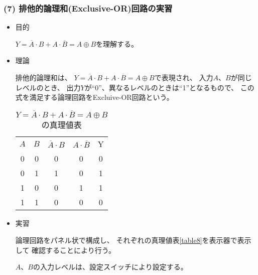 \documentclass[12pt]{jarticle}
\begin{document}
\subsubsection*{(7) 排他的論理和(Exclusive-OR)回路の実習}
\begin{itemize}
    \item 目的

          $Y = \overline{A} \cdot B + A \cdot \overline{B} = A \oplus B$を理解する。

    \item 理論

          排他的論理和は、
          $Y = \overline{A} \cdot B + A \cdot \overline{B} = A \oplus B$で表現され、
          入力$A$、$B$が同じレベルのとき、
          出力$Y$が``0''、異なるレベルのときは``1''となるもので、
          この式を満足する論理回路をExcluive-OR回路という。

          \begin{table}[h]
              \caption{$Y = \overline{A} \cdot B + A \cdot \overline{B} = A \oplus B$ の真理値表}
              \label{tbl8}
              \begin{center}
                  \begin{tabular}{|c|c||c|c|c|}
                      \hline
                      $A$ & $B$ & $\overline{A} \cdot B$ & $A \cdot \overline{B}$ & Y \\
                      \hhline{|=|=#=|=|=|}
                      0   & 0   & 0                      & 0                      & 0 \\
                      \hline
                      0   & 1   & 1                      & 0                      & 1 \\
                      \hline
                      1   & 0   & 0                      & 1                      & 1 \\
                      \hline
                      1   & 1   & 0                      & 0                      & 0 \\
                      \hline
                  \end{tabular}
              \end{center}
          \end{table}

    \item 実習

          論理回路をパネル状で構成し、
          それぞれの真理値表\ref{table8}を表示器で表示して
          確認することにより行う。

          $A$、$B$の入力レベルは、設定スイッチにより設定する。
\end{itemize}
\end{document}
